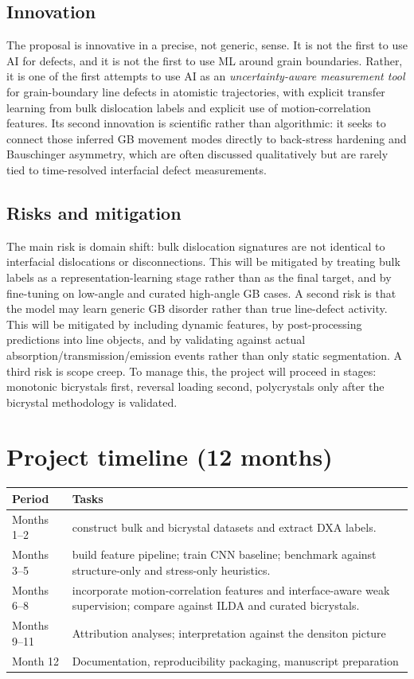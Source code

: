 \documentclass[11pt]{article}
\begin{document}
\subsection*{Innovation}
The proposal is innovative in a precise, not generic, sense. It is not the first to use AI for defects, and it is not the first to use ML around grain boundaries. Rather, it is one of the first attempts to use AI as an \emph{uncertainty-aware measurement tool} for grain-boundary line defects in atomistic trajectories, with explicit transfer learning from bulk dislocation labels and explicit use of motion-correlation features. Its second innovation is scientific rather than algorithmic: it seeks to connect those inferred GB movement modes directly to back-stress hardening and Bauschinger asymmetry, which are often discussed qualitatively but are rarely tied to time-resolved interfacial defect measurements.

\subsection*{Risks and mitigation}
The main risk is domain shift: bulk dislocation signatures are not identical to interfacial dislocations or disconnections. This will be mitigated by treating bulk labels as a representation-learning stage rather than as the final target, and by fine-tuning on low-angle and curated high-angle GB cases. A second risk is that the model may learn generic GB disorder rather than true line-defect activity. This will be mitigated by including dynamic features, by post-processing predictions into line objects, and by validating against actual absorption/transmission/emission events rather than only static segmentation. A third risk is scope creep. To manage this, the project will proceed in stages: monotonic bicrystals first, reversal loading second, polycrystals only after the bicrystal methodology is validated.


\section*{Project timeline (12 months)}

\begin{center}
\small
\begin{tabular}{|l|l|}
\hline
\textbf{Period} & \textbf{Tasks} \\
\hline
Months 1--2  & construct bulk and bicrystal datasets and extract DXA labels. \\
Months 3--5  & build feature pipeline; train CNN baseline; benchmark against structure-only and stress-only heuristics. \\
Months 6--8  & incorporate motion-correlation features and interface-aware weak supervision; compare against ILDA and curated bicrystals. \\
Months 9--11 & Attribution analyses; interpretation against the densiton picture \\
Month 12     & Documentation, reproducibility packaging, manuscript preparation \\
\hline
\end{tabular}
\end{center}
\end{document}
